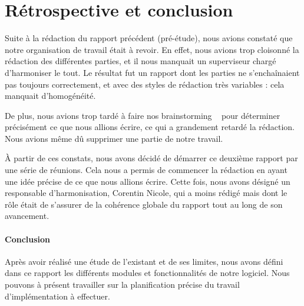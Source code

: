 \section{Rétrospective et conclusion}
	Suite à la rédaction du rapport précédent (pré-étude), nous avions constaté que notre organisation de travail était à revoir. En effet, nous avions trop cloisonné la rédaction des différentes parties, et il nous manquait un superviseur chargé d'harmoniser le tout. Le résultat fut un rapport dont les parties ne s'enchaînaient pas toujours correctement, et avec des styles de rédaction très variables : cela manquait d'homogénéité.

	De plus, nous avions trop tardé à faire nos \og brainstorming \fg~ pour déterminer précisément ce que nous allions écrire, ce qui a grandement retardé la rédaction. Nous avions même dû supprimer une partie de notre travail.

	À partir de ces constats, nous avons décidé de démarrer ce deuxième rapport par une série de réunions. Cela nous a permis de commencer la rédaction en ayant une idée précise de ce que nous allions écrire. Cette fois, nous avons désigné un responsable d'harmonisation, Corentin {\sc Nicole}, qui a moins rédigé mais dont le rôle était de s'assurer de la cohérence globale du rapport tout au long de son avancement.

	\paragraph{Conclusion} Après avoir réalisé une étude de l'existant et de ses limites, nous avons défini dans ce rapport les différents modules et fonctionnalités de notre logiciel. Nous pouvons à présent travailler sur la planification précise du travail d'implémentation à effectuer. 